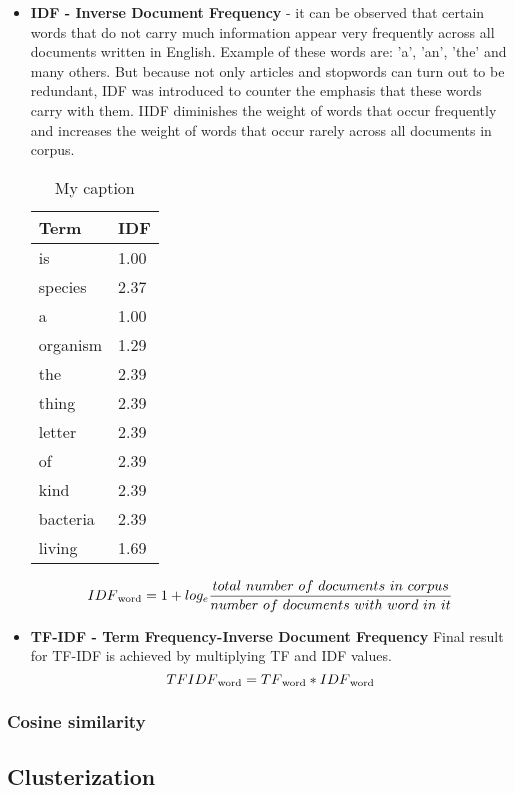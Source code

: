 \begin{itemize}
	\item \textbf{IDF - Inverse Document Frequency} - it can be observed that certain words that do not carry much information appear very frequently across all documents written in English. Example of these words are: 'a', 'an', 'the' and many others. But because not only articles and stopwords can turn out to be redundant, IDF was introduced to counter the emphasis that these words carry with them. IIDF diminishes the weight of words that occur frequently and increases the weight of words that occur rarely across all documents in corpus.

	
	\begin{table}[H]
		\centering
		\caption{My caption}
		\label{my-label}
		\begin{tabular}{@{}ll@{}}
			\toprule
			Term     & IDF  \\ \midrule
			is       & 1.00 \\
			species  & 2.37 \\
			a        & 1.00 \\
			organism & 1.29 \\
			the      & 2.39 \\
			thing    & 2.39 \\
			letter   & 2.39 \\
			of       & 2.39 \\
			kind     & 2.39 \\
			bacteria & 2.39 \\
			living   & 1.69 \\ \bottomrule
		\end{tabular}
	\end{table}
	
		\[IDF\textsubscript{word}=1+log_e \frac{total\ number\ of\ documents\ in\ corpus}{number\ of\ documents\ with\ word\ in\ it}\]

	\item \textbf{TF-IDF - Term Frequency-Inverse Document Frequency}
	Final result for TF-IDF is achieved by multiplying TF and IDF values.
	\[TFIDF\textsubscript{word}=TF\textsubscript{word} * IDF\textsubscript{word}\]
\end{itemize}

\subsubsection{Cosine similarity}

\subsection{Clusterization}
